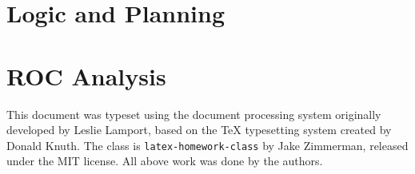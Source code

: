 \documentclass[11pt,largemargins, anonymous]{homework}
\begin{document}
\part{Logic and Planning}

\part{ROC Analysis}


\begin{colophon}
    This document was typeset using the \LaTeXe{} document processing system
    originally developed by Leslie Lamport, based on the \TeX{} typesetting system
    created by Donald Knuth.
    The class is \texttt{latex-homework-class} by Jake Zimmerman,
    released under the MIT license.
    All above work was done by the authors.
\end{colophon}
\end{document}
